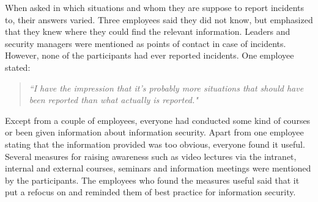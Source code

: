 When asked in which situations and whom they are suppose to report incidents to, their answers varied. Three employees said they did not know, but emphasized that they knew where they could find the relevant information. Leaders and security managers were mentioned as points of contact in case of incidents. However, none of the participants had ever reported incidents. One employee stated: 
\begin{quote}
\textit{``I have the impression that it's probably more situations that should have been reported than what actually is reported."}
\end{quote}

Except from a couple of employees, everyone had conducted some kind of courses or been given information about information security. Apart from one employee stating that the information provided was too obvious, everyone found it useful. Several measures for raising awareness such as video lectures via the intranet, internal and external courses, seminars and information meetings were mentioned by the participants. The employees who found the measures useful said that it put a refocus on and reminded them of best practice for information security.